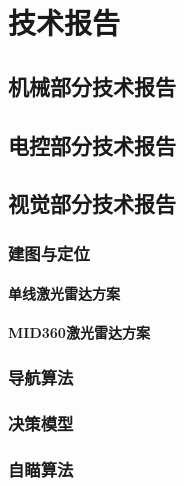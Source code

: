 
\chapter{技术报告}

\section{机械部分技术报告}

\section{电控部分技术报告}

\section{视觉部分技术报告}

\subsection{建图与定位}

\subsubsection{单线激光雷达方案}

\subsubsection{MID360激光雷达方案}

\subsection{导航算法}

\subsection{决策模型}

\subsection{自瞄算法}